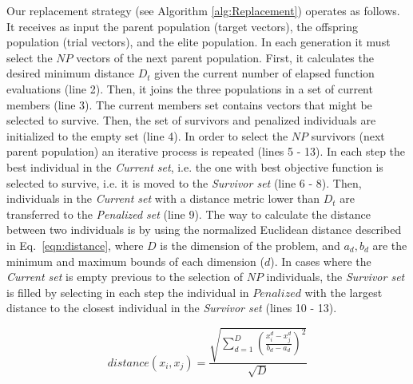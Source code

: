 Our replacement strategy (see Algorithm \ref{alg:Replacement}) operates as follows.
%
It receives as input the parent population (target vectors), the offspring population (trial vectors), and the elite population.
%
In each generation it must select the $NP$ vectors of the next parent population.
%
First, it calculates the desired minimum distance $D_t$ given the current number of elapsed function evaluations (line 2).
%
Then, it joins the three populations in a set of current members (line 3).
%
The current members set contains vectors that might be selected to survive.
%
Then, the set of survivors and penalized individuals are initialized to the empty set (line 4).
%
In order to select the $NP$ survivors (next parent population) an iterative process is repeated (lines 5 - 13).
%
In each step the best individual in the \textit{Current set}, i.e. the one with best objective function is selected
to survive, i.e. it is moved to the \textit{Survivor set} (line 6 - 8).
%
Then, individuals in the \textit{Current set} with a distance metric lower than $D_t$ are transferred to the \textit{Penalized set} (line 9).
%
The way to calculate the distance between two individuals is by using the normalized Euclidean distance described in Eq.~\ref{eqn:distance}, where $D$ is the dimension of the problem, and $a_d, b_d$ are the minimum and maximum bounds of each dimension ($d$).
%
%
In cases where the \textit{Current set} is empty previous to the selection of $NP$ individuals, the \textit{Survivor set} is filled by selecting in each step 
the individual in $Penalized$ with the largest distance to the closest individual in the \textit{Survivor set} (lines 10 - 13).

\begin{equation}\label{eqn:distance}
distance ( x_{i}, x_j ) = \frac{\sqrt{ \sum_{d=1}^D \left ( \frac{x_{i}^d - x_j^d}{b_d - a_d} \right )^2  }} {\sqrt{D}}
\end{equation}


